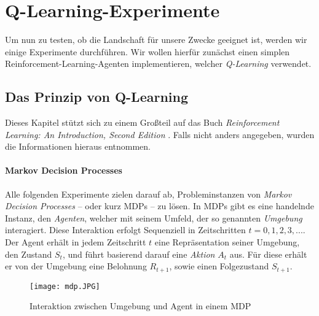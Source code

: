 \section{Q-Learning-Experimente}

Um nun zu testen, ob die Landschaft für unsere Zwecke geeignet ist, werden wir einige Experimente durchführen. Wir wollen hierfür zunächst einen simplen Reinforcement-Learning-Agenten implementieren, welcher \textit{Q-Learning} verwendet.

\subsection{Das Prinzip von Q-Learning}

Dieses Kapitel stützt sich zu einem Großteil auf das Buch \textit{Reinforcement Learning: An Introduction, Second Edition} \cite{06_sutton2018reinforcement}. Falls nicht anders angegeben, wurden die Informationen hieraus entnommen.

\paragraph{Markov Decision Processes}
Alle folgenden Experimente zielen darauf ab, Probleminstanzen von \textit{Markov Decision Processes} -- oder kurz MDPs -- zu lösen. In MDPs gibt es eine handelnde Instanz, den \textit{Agenten}, welcher mit seinem Umfeld, der so genannten \textit{Umgebung} interagiert. Diese Interaktion erfolgt Sequenziell in Zeitschritten $ t = 0, 1, 2, 3, ... $. Der Agent erhält in jedem Zeitschritt $ t $ eine Repräsentation seiner Umgebung, den Zustand $ S_t $, und führt basierend darauf eine \textit{Aktion} $ A_t $ aus. Für diese erhält er von der Umgebung eine Belohnung $ R_{t + 1} $, sowie einen Folgezustand $ S_{t + 1} $.

\begin{figure}[H]
    \centering
    \texttt{[image: mdp.JPG]}
    \caption{Interaktion zwischen Umgebung und Agent in einem MDP} \label{img:mdp}
\end{figure}

